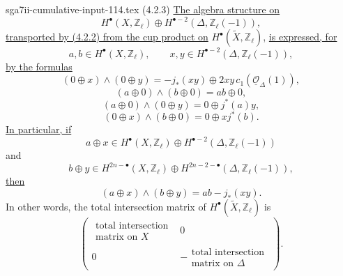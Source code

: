 \begin{filecontents*}{sga7ii-cumulative-input-114.tex}
\smallskip
\noindent
\textup{(4.2.3)} \underline{The algebra structure on}
\[
H^\bullet(X,\mathbb Z_\ell)\oplus
H^{\bullet-2}(\Delta,\mathbb Z_\ell(-1)),
\]
\underline{transported by (4.2.2) from the cup product on}
$H^\bullet(\widetilde X,\mathbb Z_\ell)$,
\underline{is expressed, for}
\[
a,b\in H^\bullet(X,\mathbb Z_\ell),
\qquad
x,y\in H^{\bullet-2}(\Delta,\mathbb Z_\ell(-1)),
\]
\underline{by the formulas}
\begin{equation}\tag{4.2.3.1}
(0\oplus x)\wedge(0\oplus y)
=-j_*(xy)\oplus2xy\,c_1(\underline{\mathcal O}_\Delta(1)),
\end{equation}
\begin{equation}\tag{4.2.3.2}
(a\oplus0)\wedge(b\oplus0)=ab\oplus0,
\end{equation}
\begin{equation}\tag{4.2.3.3}
(a\oplus0)\wedge(0\oplus y)=0\oplus j^*(a)y,
\end{equation}
\begin{equation}\tag{4.2.3.4}
(0\oplus x)\wedge(b\oplus0)=0\oplus xj^*(b).
\end{equation}
\underline{In particular, if}
\[
a\oplus x\in H^\bullet(X,\mathbb Z_\ell)
  \oplus H^{\bullet-2}(\Delta,\mathbb Z_\ell(-1))
\]
and
\[
b\oplus y\in H^{2n-\bullet}(X,\mathbb Z_\ell)
  \oplus H^{2n-2-\bullet}(\Delta,\mathbb Z_\ell(-1)),
\]
\underline{then}
\begin{equation}\tag{4.2.3.5}
(a\oplus x)\wedge(b\oplus y)=ab-j_*(xy).
\end{equation}
In other words, the total intersection matrix of
$H^\bullet(\widetilde X,\mathbb Z_\ell)$ is
\[
\left(
\begin{array}{c|c}
\begin{array}{c}
\text{total intersection}\\[-1pt]
\text{matrix on $X$}
\end{array} & 0\\ \hline
0 &
-\begin{array}{c}
\text{total intersection}\\[-1pt]
\text{matrix on $\Delta$}
\end{array}
\end{array}
\right).
\]


\end{filecontents*}
